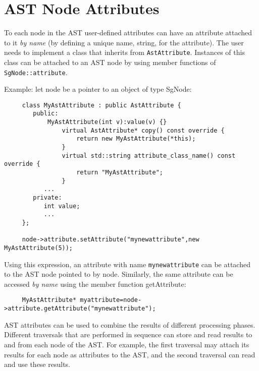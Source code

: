 
\section{AST Node Attributes}

To each node in the AST user-defined attributes can have an attribute attached to 
it {\em by name} (by defining a unique name, string, for the attribute). The
user needs to implement a class that inherits from {\tt AstAttribute}. Instances of this
class can be attached to an AST node by using member functions of {\tt SgNode::attribute}.

Example: let node be a pointer to an object of type SgNode:
{\indent
{\mySmallFontSize
\begin{verbatim}
     class MyAstAttribute : public AstAttribute {
        public:
	        MyAstAttribute(int v):value(v) {}
                virtual AstAttribute* copy() const override {
                    return new MyAstAttribute(*this);
                }
                virtual std::string attribute_class_name() const override {
                    return "MyAstAttribute";
                }
           ...
        private:
           int value;
           ...
     };

     node->attribute.setAttribute("mynewattribute",new MyAstAttribute(5));
\end{verbatim}
}}
Using this expression, an attribute with name {\tt mynewattribute} can
be attached to the AST node pointed to by node. Similarly, the same attribute can be
accessed {\em by name} using the member function getAttribute:

{\indent
{\mySmallFontSize
\begin{verbatim}
     MyAstAttribute* myattribute=node->attribute.getAttribute("mynewattribute");
\end{verbatim}
}}
AST attributes can be used to combine the results of different
processing phases. Different traversals that are performed in
sequence can store and read results to and from each node of the
AST. For example, the first traversal may attach its results for each node as
attributes to the AST, and the second traversal can read and use these results.


